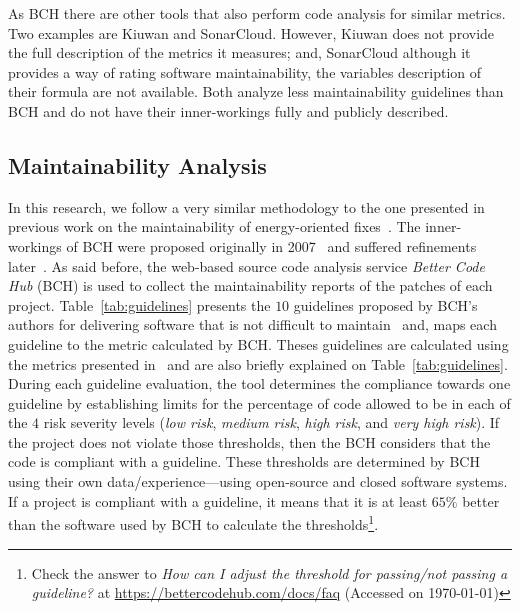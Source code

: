 \documentclass[smallextended]{svjour3}       %
\begin{document}
As BCH there are other tools that also perform code analysis for similar 
metrics. Two examples are Kiuwan and SonarCloud. However, Kiuwan does
not provide the full description of the metrics it measures; and, SonarCloud
although it provides a way of rating software maintainability, the variables 
description of their formula are not available. Both analyze less maintainability
guidelines than BCH and do not have their inner-workings fully and publicly described.

\subsection{Maintainability Analysis}\label{sec:main_analysis}

In this research, we follow a very similar methodology to the one 
presented in previous work on the maintainability of energy-oriented 
fixes~\cite{8919169}. The inner-workings of BCH were proposed
originally in 2007~\cite{4335232} and suffered refinements later~\cite{5609747,6113040,baggen2012}. 
As said before, the web-based source code 
analysis service \emph{Better Code Hub} (BCH) is used to collect the 
maintainability reports of the patches of each project. 
Table~\ref{tab:guidelines} presents the $10$ guidelines proposed
by BCH's authors for delivering software that is not difficult to
maintain~\cite{Visser:2016:OREILLY} and, maps each guideline to the 
metric calculated by BCH. Theses guidelines are calculated using the 
metrics presented in~\cite{criteria:2017} and are also briefly 
explained on Table~\ref{tab:guidelines}. 
During each guideline evaluation, the tool determines the compliance 
towards one guideline by establishing limits for the percentage of 
code allowed to be in each of the $4$ risk severity levels
(\emph{low risk}, \emph{medium risk}, \emph{high risk}, and 
\emph{very high risk}). If the project does not violate those 
thresholds, then the BCH considers that the code is compliant with 
a guideline. These thresholds are determined by BCH using their own
data/experience---using open-source and closed software systems. If 
a project is compliant with a guideline, it means that it is at 
least $65\%$ better than the software used by BCH to calculate the 
thresholds\footnote{Check the answer to \emph{How can I adjust the 
threshold for passing/not passing a guideline?} at
\url{https://bettercodehub.com/docs/faq} (Accessed on \today{})}.
\end{document}
